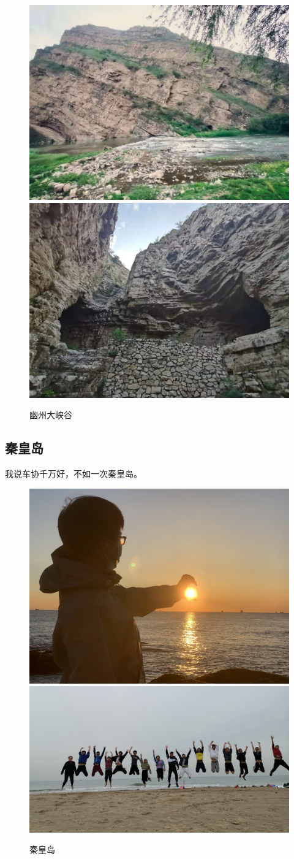 \documentclass{ctexbook}
\begin{document}
\begin{figure}[H]
    \centering
    \includegraphics[width=0.45\linewidth]{fig/幽州大峡谷1}
    \hfill
    \includegraphics[width=0.45\linewidth]{fig/幽州大峡谷2}
    \caption{幽州大峡谷}
\end{figure}



\subsection{秦皇岛}
我说车协千万好，不如一次秦皇岛。
\begin{figure}[H]
    \centering
    \includegraphics[width=0.45\linewidth]{fig/秦皇岛日出.jpg}
    \hfill
    \includegraphics[width=0.45\linewidth]{fig/秦皇岛跳.jpg}
    \caption{秦皇岛}
\end{figure}
\end{document}

